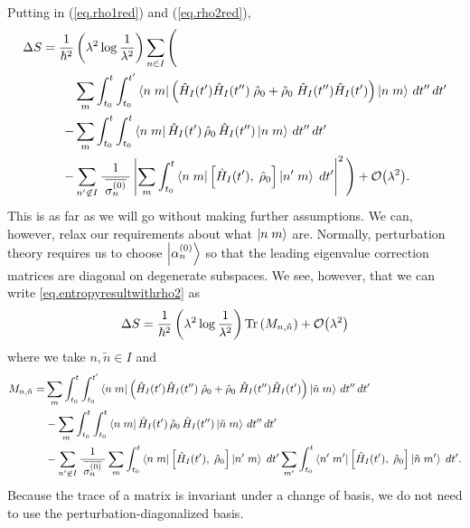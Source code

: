 Putting in (\ref{eq.rho1red}) and (\ref{eq.rho2red}),
\begin{align}\label{eq.entropyresultwithrho2}
\Delta S = \frac{1}{\hbar^2}&\left(\lambda^2 \log\frac{1}{\lambda^2}\right)\sum_{n \in I} \Bigg( \\
& \sum_m\int_{t_0}^t \int_{t_0}^{t^\prime} \left\langle n\;m\right| \left( \hat{H}_I (t^\prime) \hat{H}_I(t^{\prime\prime}) \;\hat{\rho}_0 + \hat{\rho}_0\; \hat{H}_I (t^{\prime\prime}) \hat{H}_I(t^{\prime}) \right) \left|n\;m\right\rangle\,dt^{\prime\prime}\,dt^\prime \nonumber\\
-& \sum_m\int_{t_0}^t \int_{t_0}^{t} \left\langle n\;m\right|\hat{H}_I (t^\prime) \,\hat{\rho}_0\, \hat{H}_I (t^{\prime\prime})\left|n\;m\right\rangle\,dt^{\prime\prime}\,dt^\prime \nonumber\\
-& \sum_{n^\prime \not \in I} \frac{1}{\;\overline{\sigma_n^{(0)}}\;} \left|\sum_m\int_{t_0}^t \left\langle n\;m\right| \left[\hat{H}_I(t^\prime),\; \hat{\rho}_0 \right] \left|n^\prime\;m\right\rangle\;dt^\prime \right|^2
\Bigg) + \mathcal{O}{\left(\lambda^2\right)}. \nonumber
\end{align}
This is as far as we will go without making further assumptions. We can, however, relax our requirements about what \(\left|n\;m\right\rangle\) are. Normally, perturbation theory requires us to choose \(\left|\alpha_n^{(0)}\right\rangle\) so that the leading eigenvalue correction matrices are diagonal on degenerate subspaces. We see, however, that we can write \ref{eq.entropyresultwithrho2} as 
\[
\Delta S = \frac{1}{\hbar^2}\left(\lambda^2 \log\frac{1}{\lambda^2}\right)\operatorname{Tr}\left(M_{n,\tilde{n}}\right) + \mathcal{O}{\left(\lambda^2\right)}
\]
where we take \(n,\tilde{n} \in I\) and
\begin{align*}
M_{n,\tilde{n}} = &\sum_m\int_{t_0}^t \int_{t_0}^{t^\prime} \left\langle n\;m\right| \left( \hat{H}_I (t^\prime) \hat{H}_I(t^{\prime\prime}) \;\hat{\rho}_0 + \hat{\rho}_0\; \hat{H}_I (t^{\prime\prime}) \hat{H}_I(t^{\prime}) \right) \left|\tilde{n}\;m\right\rangle\,dt^{\prime\prime}\,dt^\prime \nonumber\\
&- \sum_m\int_{t_0}^t \int_{t_0}^{t} \left\langle n\;m\right|\hat{H}_I (t^\prime) \,\hat{\rho}_0\, \hat{H}_I (t^{\prime\prime})\left|\tilde{n}\;m\right\rangle\,dt^{\prime\prime}\,dt^\prime \nonumber\\
&- \sum_{n^\prime \not \in I} \frac{1}{\;\overline{\sigma_n^{(0)}}\;} \sum_m\int_{t_0}^t \left\langle n\;m\right| \left[\hat{H}_I(t^\prime),\; \hat{\rho}_0 \right] \left|n^\prime\;m\right\rangle\;dt^\prime \sum_{m^\prime}\int_{t_0}^t \left\langle n^\prime\;m^\prime\right| \left[\hat{H}_I(t^\prime),\; \hat{\rho}_0 \right] \left|\tilde{n}\;m^\prime\right\rangle\;dt^\prime.
\end{align*}
Because the trace of a matrix is invariant under a change of basis, we do not need to use the perturbation-diagonalized basis.

